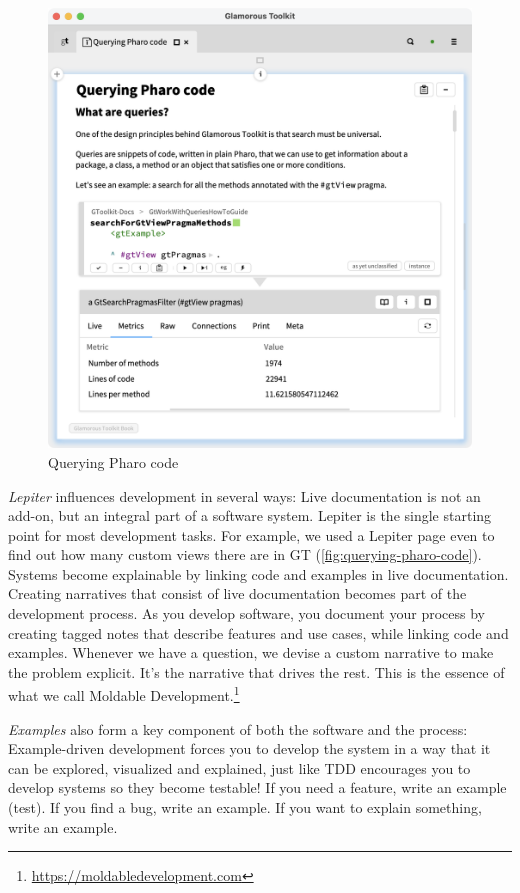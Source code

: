 \documentclass[conference]{IEEEtran}
\newcommand{\figlabel}[1]{\label{fig:#1}}
\begin{document}
\begin{figure}[htbp]
  \centering
  \includegraphics[width=\columnwidth]{figures/querying-pharo-code.png}
  \caption{Querying Pharo code}
  \figlabel{querying-pharo-code}
\end{figure}


\emph{Lepiter} influences development in several ways:
Live documentation is not an add-on, but an integral part of a software system.
Lepiter is the single starting point for most development tasks. 
For example, we used a Lepiter page even to find out how many custom views there are in GT (\autoref{fig:querying-pharo-code}).
Systems become explainable by linking code and examples in live documentation.
Creating narratives that consist of live documentation becomes part of the development process.
As you develop software, you document your process by creating tagged notes that describe features and use cases, while linking code and examples.
Whenever we have a question, we devise a custom narrative to make the problem explicit. 
It’s the narrative that drives the rest. 
This is the essence of what we call Moldable Development.\footnote{\url{https://moldabledevelopment.com}}


\emph{Examples} also form a key component of both the software and the process:
Example-driven development\cite{Girb19a} forces you to develop the system in a way that it can be explored, visualized and explained, just like TDD encourages you to develop systems so they become testable!
If you need a feature, write an example (test).
If you find a bug, write an example.
If you want to explain something, write an example.
\end{document}
